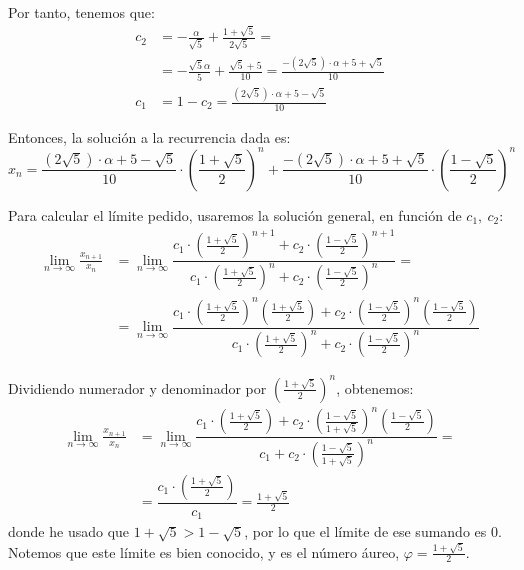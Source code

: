 \begin{ejercicio}
    Por tanto, tenemos que:
    \begin{align*}
        c_2 &= -\frac{\alpha}{\sqrt{5}} + \frac{1+\sqrt{5}}{2\sqrt{5}}=\\
        &= -\frac{\sqrt{5}\alpha}{5} + \frac{\sqrt{5}+5}{10}
        = \frac{-(2\sqrt{5})\cdot \alpha + 5+\sqrt{5}}{10}\\
        c_1 &= 1-c_2 = \frac{(2\sqrt{5})\cdot \alpha +5-\sqrt{5}}{10}
    \end{align*}
    
    Entonces, la solución a la recurrencia dada es:
    \begin{equation*}
        x_n = \frac{(2\sqrt{5})\cdot \alpha +5-\sqrt{5}}{10}\cdot \left(\frac{1+\sqrt{5}}{2}\right)^n + \frac{-(2\sqrt{5})\cdot \alpha + 5+\sqrt{5}}{10}\cdot \left(\frac{1-\sqrt{5}}{2}\right)^n
    \end{equation*}

    Para calcular el límite pedido, usaremos la solución general, en función de $c_1,~c_2$:
    \begin{align*}
        \lim_{n\to \infty} \frac{x_{n+1}}{x_n}
        &= \lim_{n\to \infty} \dfrac{c_1\cdot \left(\frac{1+\sqrt{5}}{2}\right)^{n+1} + c_2\cdot \left(\frac{1-\sqrt{5}}{2}\right)^{n+1}}{c_1\cdot \left(\frac{1+\sqrt{5}}{2}\right)^n + c_2\cdot \left(\frac{1-\sqrt{5}}{2}\right)^n}
        =\\&= \lim_{n\to \infty} \dfrac{c_1\cdot \left(\frac{1+\sqrt{5}}{2}\right)^{n}\left(\frac{1+\sqrt{5}}{2}\right) + c_2\cdot \left(\frac{1-\sqrt{5}}{2}\right)^{n}\left(\frac{1-\sqrt{5}}{2}\right)}{c_1\cdot \left(\frac{1+\sqrt{5}}{2}\right)^n + c_2\cdot \left(\frac{1-\sqrt{5}}{2}\right)^n}
    \end{align*}

    Dividiendo numerador y denominador por $\left(\frac{1+\sqrt{5}}{2}\right)^n$, obtenemos:
    \begin{align*}
        \lim_{n\to \infty} \frac{x_{n+1}}{x_n}
        &= \lim_{n\to \infty} \dfrac{c_1\cdot \left(\frac{1+\sqrt{5}}{2}\right) + c_2\cdot \left(\frac{1-\sqrt{5}}{1+\sqrt{5}}\right)^{n}\left(\frac{1-\sqrt{5}}{2}\right)}{c_1 + c_2\cdot \left(\frac{1-\sqrt{5}}{1+\sqrt{5}}\right)^n}
        =\\&= \dfrac{c_1\cdot \left(\frac{1+\sqrt{5}}{2}\right)}{c_1}
        = \frac{1+\sqrt{5}}{2}
    \end{align*}
    donde he usado que $1+\sqrt{5} > 1-\sqrt{5}$, por lo que el límite de ese sumando es $0$.
    Notemos que este límite es bien conocido, y es el número áureo, $\varphi = \frac{1+\sqrt{5}}{2}$.
\end{ejercicio}

